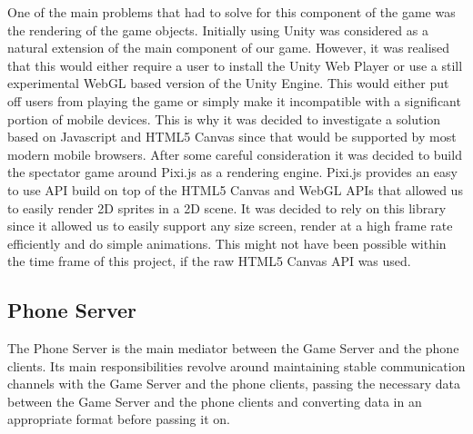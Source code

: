 \documentclass[a4paper,11pt]{article}
\begin{document}
One of the main problems that had to solve for this component of the game was the rendering of the game objects. Initially using Unity was considered as a natural extension of the main component of our game. However, it was realised that this would either require a user to install the Unity Web Player or use a still experimental WebGL based version of the Unity Engine. This would either put off users from playing the game or simply make it incompatible with a significant portion of mobile devices. This is why it was decided to investigate a solution based on Javascript and HTML5 Canvas\cite{html5_canvas} since that would be supported by most modern mobile browsers. After some careful consideration it was decided to build the spectator game around Pixi.js\cite{pixi_js} as a rendering engine. Pixi.js provides an easy to use API build on top of the HTML5 Canvas and WebGL APIs that allowed us to easily render 2D sprites in a 2D scene. It was  decided to rely on this library since it allowed us to easily support any size screen, render at a high frame rate efficiently and do simple animations. This might not have been possible within the time frame of this project, if the raw HTML5 Canvas API was used.

\subsection{Phone Server}
The Phone Server is the main mediator between the Game Server and the phone clients. Its main responsibilities revolve around maintaining stable communication channels with the Game Server and the phone clients, passing the necessary data between the Game Server and the phone clients and converting data in an appropriate format before passing it on.
\end{document}
